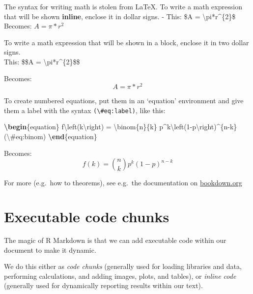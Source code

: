 \documentclass[a4paper, twoside]{templates/ociamthesis}
\newenvironment{Shaded}{\begin{snugshade}}{\end{snugshade}}
\newcommand{\ExtensionTok}[1]{#1}
\newcommand{\KeywordTok}[1]{\textcolor[rgb]{0.13,0.29,0.53}{\textbf{#1}}}
\newcommand{\NormalTok}[1]{#1}
\newcommand{\SpecialCharTok}[1]{\textcolor[rgb]{0.00,0.00,0.00}{#1}}
\newcommand{\SpecialStringTok}[1]{\textcolor[rgb]{0.31,0.60,0.02}{#1}}
\renewenvironment{Shaded}
{
  \vspace{10pt}%
  \begin{snugshade}%
}{%
  \end{snugshade}%
  \vspace{8pt}%
}
\begin{document}
The syntax for writing math is stolen from LaTeX. To write a math expression that will be shown \textbf{inline}, enclose it in dollar signs.
- This: \$A = \textbackslash pi*r\^{}\{2\}\$ Becomes: \(A = \pi*r^{2}\)

To write a math expression that will be shown in a block, enclose it in two dollar signs.\\
This: \$\$A = \textbackslash pi*r\^{}\{2\}\$\$

Becomes:
\[A = \pi*r^{2}\]

To create numbered equations, put them in an `equation' environment and give them a label with the syntax \texttt{(\textbackslash{}\#eq:label)}, like this:

\begin{Shaded}
\begin{Highlighting}[]
\KeywordTok{\textbackslash{}begin}\NormalTok{\{}\ExtensionTok{equation}\NormalTok{\}}\SpecialStringTok{ }
\SpecialStringTok{  f}\SpecialCharTok{\textbackslash{}left}\SpecialStringTok{(k}\SpecialCharTok{\textbackslash{}right}\SpecialStringTok{) = }\SpecialCharTok{\textbackslash{}binom}\SpecialStringTok{\{n\}\{k\} p\^{}k}\SpecialCharTok{\textbackslash{}left}\SpecialStringTok{(1{-}p}\SpecialCharTok{\textbackslash{}right}\SpecialStringTok{)\^{}\{n{-}k\}}
\SpecialStringTok{  (}\SpecialCharTok{\textbackslash{}\#}\SpecialStringTok{eq:binom)}
\KeywordTok{\textbackslash{}end}\NormalTok{\{}\ExtensionTok{equation}\NormalTok{\} }
\end{Highlighting}
\end{Shaded}

Becomes:
\begin{equation}
f\left(k\right)=\binom{n}{k}p^k\left(1-p\right)^{n-k}
\label{eq:binom}
\end{equation}

For more (e.g.~how to theorems), see e.g.~the documentation on \href{https://bookdown.org/yihui/bookdown/markdown-extensions-by-bookdown.html\#equations}{bookdown.org}

\hypertarget{code}{%
\section{Executable code chunks}\label{code}}

The magic of R Markdown is that we can add executable code within our document to make it dynamic.

We do this either as \emph{code chunks} (generally used for loading libraries and data, performing calculations, and adding images, plots, and tables), or \emph{inline code} (generally used for dynamically reporting results within our text).
\end{document}
